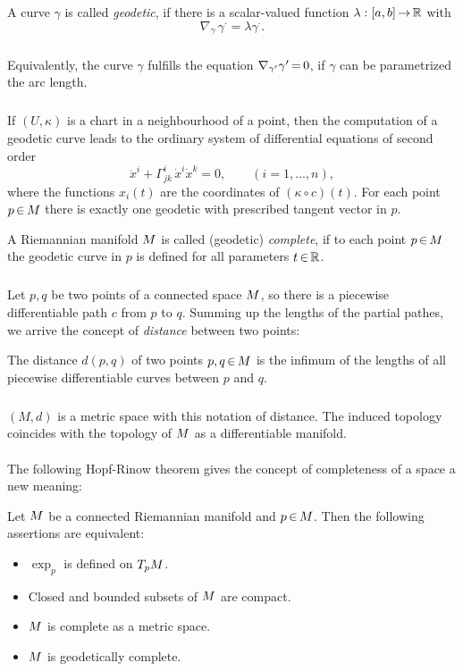 \documentclass[11pt,twoside]{article}
\begin{document}
\begin{definition}
A curve $\gamma$ is called \textit{geodetic},
if there is a scalar-valued function $\lambda:[a,b] {\,\to\,} {\mathbb{R}}$ with
\[
\nabla_{\gamma^{\cdot}} \gamma^{\cdot} = \lambda \gamma^{\cdot}.
\]
\end{definition}

\subparagraph{}
Equivalently,
the curve $\gamma$ fulfills the equation $\nabla_{\gamma'} \gamma' {\,=\,} 0$,
if $\gamma$ can be parametrized {\wrt} the arc length.

\subparagraph{}
If $(U,\kappa)$ is a chart in a neighbourhood of a point,
then the computation of a geodetic curve leads to the ordinary system
of differential equations of second order
\[
\ddot{x}^i + \Gamma^i_{jk} \, \dot{x}^i \dot{x}^k = 0, \qquad (i=1,\ldots,n),
\]
where the functions $x_i(t)$ are the coordinates of $(\kappa \circ c)(t)$.
For each point $p {\,\in\,} {M}$ there is exactly one geodetic with prescribed
tangent vector in $p$.

\begin{definition}
A Riemannian manifold ${M}$ is called (geodetic) \textit{complete},
if to each point $p {\,\in\,} {M}$ the geodetic curve in $p$ is defined 
for all parameters $t {\,\in\,} {\mathbb{R}}$.
\end{definition}

\subparagraph{}
Let $p,q$ be two points of a connected space ${M}$,
so there is a piecewise differentiable path $c$ from $p$ to $q$.
Summing up the lengths of the partial pathes,
we arrive the concept of \textit{distance} between two points:

\begin{definition}
The distance $d(p,q)$ of two points $p,q {\,\in\,} {M}$ is the infimum
of the lengths 
of all piecewise differentiable curves between $p$ and $q$.
\end{definition}

\subparagraph{}
$(M,d)$ is a metric space with this notation of distance.
The induced topology coincides with the topology of ${M}$
as a differentiable manifold.

\paragraph{}
The following Hopf-Rinow theorem gives the concept of completeness of a space a new meaning:

\begin{theorem}
Let ${M}$ be a connected Riemannian manifold and $p {\,\in\,} {M}$.
Then the following assertions are equivalent:
\begin{itemize}[leftmargin=15pt]
\item[1.]
$\exp_p$ is defined on $T_p {M}$.
\item[2.]
Closed and bounded subsets of ${M}$ are compact.
\item[3.]
${M}$ is complete as a metric space.
\item[4.]
${M}$ is geodetically complete.
\end{itemize}
\end{theorem}
\end{document}
